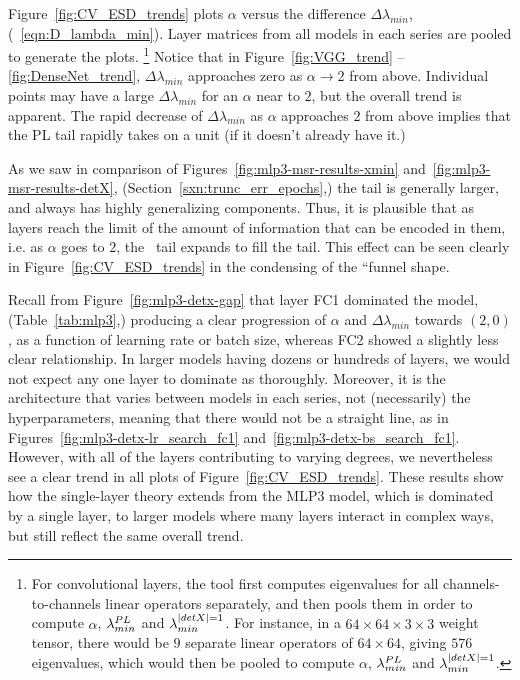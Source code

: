 Figure~\ref{fig:CV_ESD_trends} plots $\alpha$ versus the difference $\Delta\lambda_{min}$, (\EQN~\ref{eqn:D_lambda_min}).
Layer matrices from all models in each series are pooled to generate the plots.%
\footnote{For convolutional layers, the \WW tool first computes eigenvalues for all channels-to-channels linear operators separately, and then pools them in order to compute $\alpha$, $\lambda^{PL}_{min}$ and $\lambda^{\vert detX\vert=1}_{min}$. For instance, in a $64\times 64\times 3\times 3$ weight tensor, there would be $9$ separate linear operators of $64\times 64$, giving $576$ eigenvalues, which would then be pooled to compute $\alpha$, $\lambda^{PL}_{min}$ and $\lambda^{\vert detX\vert=1}_{min}$.} 
Notice that in Figure~\ref{fig:VGG_trend} -- \ref{fig:DenseNet_trend}, $\Delta\lambda_{min}$ approaches zero as $\alpha\rightarrow 2$ from above. 
Individual points may have a large $\Delta\lambda_{min}$ for an $\alpha$ near to $2$, but the overall trend is apparent. 
The rapid decrease of $\Delta\lambda_{min}$ as $\alpha$ approaches $2$ from above implies that the PL tail rapidly 
takes on a unit \TRACELOG  (if it doesn't already have it.)

As we saw in comparison of Figures~\ref{fig:mlp3-msr-results-xmin} and~\ref{fig:mlp3-msr-results-detX}, 
(Section~\ref{sxn:trunc_err_epochs},) the \TRACELOG tail is generally larger, and always has highly generalizing 
components. Thus, it is plausible that as layers reach the limit of the amount of information that can be encoded in 
them, i.e. as $\alpha$ goes to $2$, the \POWERLAW~tail expands to fill the \TRACELOG tail. This effect can be seen 
clearly in Figure~\ref{fig:CV_ESD_trends} in the condensing of the ``funnel shape.

Recall from Figure~\ref{fig:mlp3-detx-gap} that layer FC1 dominated the model, (Table~\ref{tab:mlp3},) producing a clear 
progression of $\alpha$ and $\Delta\lambda_{min}$ towards $(2, 0)$, as a function of learning rate or batch size, whereas FC2 showed a slightly less clear relationship. 
In larger models having dozens or hundreds of layers, we would not expect any one layer to dominate as thoroughly.
Moreover, it is the architecture that varies between models in each series, not (necessarily) the hyperparameters, meaning that there would not be a straight line, as in Figures~\ref{fig:mlp3-detx-lr_search_fc1} and~\ref{fig:mlp3-detx-bs_search_fc1}. 
However, with all of the layers contributing to varying degrees, we nevertheless see a clear trend in all plots of Figure~\ref{fig:CV_ESD_trends}. 
These results show how the single-layer \SETOL theory extends from the MLP3 model, which is dominated by a single layer, to larger models where many layers interact in complex ways, but still reflect the same overall trend.


